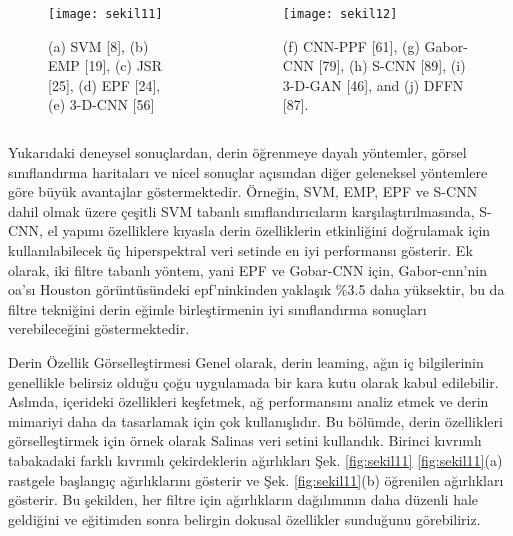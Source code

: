 \documentclass{beamer}
\begin{document}
\begin{frame}
  \begin{columns}
    \begin{column}{0.5\textwidth}
      \begin{figure}
        \texttt{[image: sekil11]}
        \label{fig:sekil7}
        \caption{(a) SVM [8], (b) EMP [19], (c) JSR [25], (d) EPF [24], (e) 3-D-CNN [56]}
      \end{figure}
    \end{column}
    \begin{column}{0.5\textwidth}
      \begin{figure}
        \texttt{[image: sekil12]}
        \label{fig:sekil8} 
        \caption{(f) CNN-PPF [61], (g) Gabor-CNN [79], (h) S-CNN [89], (i) 3-D-GAN [46], and (j) DFFN [87].}
      \end{figure}
    \end{column}
  \end{columns}
\end{frame}

\begin{frame}
Yukarıdaki deneysel sonuçlardan, derin öğrenmeye dayalı yöntemler, görsel sınıflandırma haritaları ve nicel sonuçlar açısından diğer geleneksel yöntemlere göre büyük avantajlar göstermektedir. Örneğin, SVM, EMP, EPF ve S-CNN dahil olmak üzere çeşitli SVM tabanlı sınıflandırıcıların karşılaştırılmasında, S-CNN, el yapımı özelliklere kıyasla derin özelliklerin etkinliğini doğrulamak için kullanılabilecek üç hiperspektral veri setinde en iyi performansı gösterir. Ek olarak, iki filtre tabanlı yöntem, yani EPF ve Gobar-CNN için, Gabor-cnn'nin oa'sı Houston görüntüsündeki epf'ninkinden yaklaşık \%3.5 daha yüksektir, bu da filtre tekniğini derin eğimle birleştirmenin iyi sınıflandırma sonuçları verebileceğini göstermektedir.
\end{frame}

\begin{frame}{Derin Özellik Görselleştirmesi}
  Genel olarak, derin leaming, ağın iç bilgilerinin genellikle belirsiz olduğu çoğu uygulamada bir kara kutu olarak kabul edilebilir. Aslında, içerideki özellikleri keşfetmek, ağ performansını analiz etmek ve derin mimariyi daha da tasarlamak için çok kullanışlıdır. Bu bölümde, derin özellikleri görselleştirmek için örnek olarak Salinas veri setini kullandık. Birinci kıvrımlı tabakadaki farklı kıvrımlı çekirdeklerin ağırlıkları Şek. \ref{fig:sekil11} \ref{fig:sekil11}(a) rastgele başlangıç ağırlıklarını gösterir ve Şek. \ref{fig:sekil11}(b) öğrenilen ağırlıkları gösterir. Bu şekilden, her filtre için ağırlıkların dağılımının daha düzenli hale geldiğini ve eğitimden sonra belirgin dokusal özellikler sunduğunu görebiliriz.
\end{frame}
\end{document}
